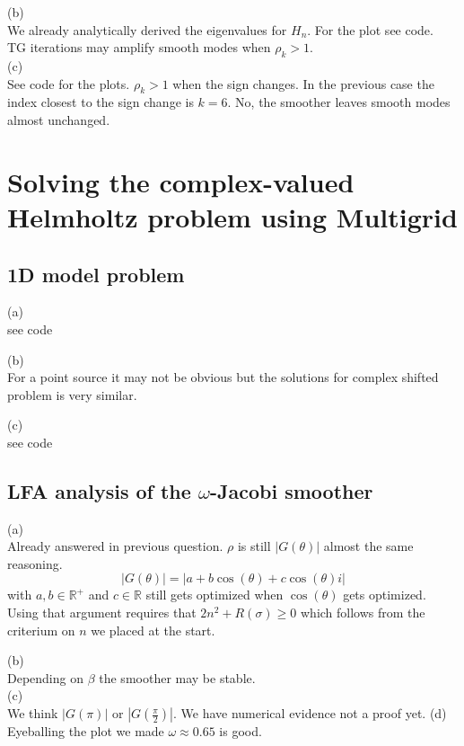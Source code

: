 \documentclass[a4paper,12pt]{article}
\begin{document}
(b) \\
We already analytically derived the eigenvalues for $H_{n}$. For the plot see code.\\
TG iterations may amplify smooth modes when $\rho_{k} >1$. \\
(c)\\
See code for the plots. $\rho_{k} >1$ when the sign changes. In the previous case the
index closest to the sign change is $k = 6$. No, the smoother leaves smooth modes almost unchanged.



\section{Solving the complex-valued Helmholtz problem using Multigrid}


\subsection{1D model problem}
(a) \\
see code

(b)\\
For a point source it may not be obvious but the solutions
for complex shifted problem is very similar.

(c) \\
see code

\subsection{LFA analysis of the $\omega$-Jacobi smoother}
(a) \\
Already answered in previous question. $\rho$ is still $|G(\theta)|$ almost the same reasoning.
\begin{equation}
    |G(\theta)| = |a + b \cos(\theta) + c \cos(\theta)i|
\end{equation}
with $a,b \in \mathbb{R}^{+}$ and $c \in  \mathbb{R}$ still gets optimized when $\cos\left(\theta\right)$
gets optimized. Using that argument requires that $2n^{2}+R(\sigma)\geq 0$ which follows from the criterium on
$n$ we placed at the start.

(b) \\
Depending on $\beta$ the smoother may be stable. \\
(c) \\
We think $|G(\pi)|$ or $|G(\frac{\pi}{2})|$. We have numerical evidence not a proof yet.
(d) \\
Eyeballing the plot we made $\omega \approx 0.65$ is good.
\end{document}
